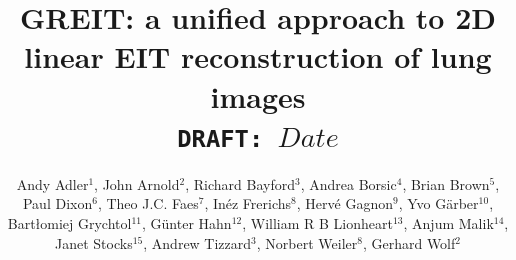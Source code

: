 \documentclass[12pt]{iopart}
\begin{document}
\title[GREIT: linear EIT image reconstruction]{%
GREIT: a unified approach to 2D linear EIT reconstruction of
       lung images
\\
{\small \tt DRAFT: $Date$}
}

\author{Andy Adler$^{1}$,
        John Arnold$^{2}$,
        Richard Bayford$^{3}$,
        Andrea Borsic$^{4}$,
        Brian Brown$^{5}$,
        Paul Dixon$^{6}$,
        Theo J.C. Faes$^{7}$,
        In\'ez Frerichs$^{8}$,
        Herv\'e Gagnon$^{9}$,
        Yvo G\"arber$^{10}$,
        Bart\l{}omiej Grychtol$^{11}$, 
        G\"unter Hahn$^{12}$,
        William R B Lionheart$^{13}$,
        Anjum Malik$^{14}$,
        Janet Stocks$^{15}$,
        Andrew Tizzard$^{3}$,
        Norbert Weiler$^{8}$,
        Gerhard Wolf$^{2}$%
       }

\address{ $^{1}$Systems and Computer Engineering,
                Carleton University, Ottawa, Canada}
\address{ $^{2}$Division of Critical Care Medicine, Department of Anesthesia,
                Children's Hospital Boston, Harvard Medical School,
                Boston, MA, USA}
\address{ $^{3}$School of Health and Social Sciences,
                Middlesex University, London, UK}
\address{ $^{4}$School of Engineering, 
                Dartmouth College, Hanover, NH, USA}
\address{ $^{5}$Medical Physics, University of Sheffield, UK}
\address{ $^{6}$Cardinal Health Care, London, UK}
\address{ $^{7}$Department of Physics and Medical Technology,
                V.U. university medical center, Amsterdam, Netherlands}
\address{ $^{8}$Department of Anaesthesiology and Intensive Care Medicine,
                University of Schleswig-Holstein, Kiel, Germany}
\address{ $^{9}$D\'epartement de g\'enie \'electrique,
                \'Ecole Polytechnique de Montr\'eal, Canada}
\address{$^{10}$Dr\"ager Medical, L\"ubeck, Germany}
\address{$^{11}$University of Strathclyde, Glasgow, UK}
\address{$^{12}$Department of Anaesthesiological Research,
                University of G\"ottingen, Germany}
\address{$^{13}$School of Mathematics, University of Manchester, UK}
\address{$^{14}$Maltron International, Rayleigh, UK}
\address{$^{15}$Institute of Child Health,
                University College London, UK}
\end{document}
